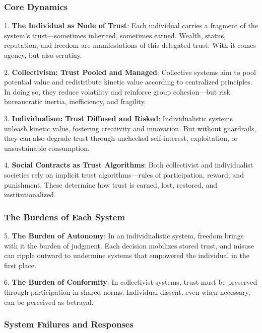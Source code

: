 \documentclass[11pt,oneside]{book}
\begin{document}
\subsubsection{Core Dynamics}


1. \textbf{The Individual as Node of Trust}: Each individual carries a fragment of the system's trust—sometimes inherited, sometimes earned. Wealth, status, reputation, and freedom are manifestations of this delegated trust. With it comes agency, but also scrutiny.



2. \textbf{Collectivism: Trust Pooled and Managed}: Collective systems aim to pool potential value and redistribute kinetic value according to centralized principles. In doing so, they reduce volatility and reinforce group cohesion—but risk bureaucratic inertia, inefficiency, and fragility.



3. \textbf{Individualism: Trust Diffused and Risked}: Individualistic systems unleash kinetic value, fostering creativity and innovation. But without guardrails, they can also degrade trust through unchecked self-interest, exploitation, or unsustainable consumption.



4. \textbf{Social Contracts as Trust Algorithms}: Both collectivist and individualist societies rely on implicit trust algorithms—rules of participation, reward, and punishment. These determine how trust is earned, lost, restored, and institutionalized.


\subsubsection{The Burdens of Each System}


5. \textbf{The Burden of Autonomy}: In an individualistic system, freedom brings with it the burden of judgment. Each decision mobilizes stored trust, and misuse can ripple outward to undermine systems that empowered the individual in the first place.



6. \textbf{The Burden of Conformity}: In collectivist systems, trust must be preserved through participation in shared norms. Individual dissent, even when necessary, can be perceived as betrayal.


\subsubsection{System Failures and Responses}
\end{document}
